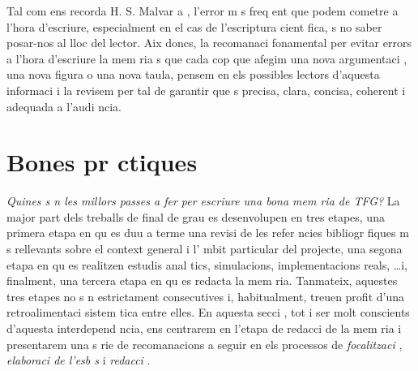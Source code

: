 Tal com ens recorda H. S. Malvar a \cite{Malvar08}, l'error m s freq ent que podem cometre a l'hora d'escriure, especialment en el cas de l'escriptura cient fica,  s no saber posar-nos al lloc del lector. Aix  doncs, la recomanaci  fonamental per evitar errors a l'hora d'escriure la mem ria  s que cada cop que afegim una nova argumentaci , una nova figura o una nova taula, pensem en els possibles lectors d'aquesta informaci  i la revisem per tal de garantir que  s precisa, clara, concisa, coherent i adequada a l'audi ncia.

\section{Bones pr ctiques}

\emph{Quines s n les millors passes a fer per escriure una bona mem ria de TFG?} La major part dels treballs de final de grau es desenvolupen en tres etapes, una primera etapa en qu  es duu a terme una revisi  de les refer ncies bibliogr fiques m s rellevants sobre el context general i l' mbit particular del projecte, una segona etapa en qu  es realitzen estudis anal tics, simulacions, implementacions reals, \ldots i, finalment, una tercera etapa en qu  es redacta la mem ria. Tanmateix, aquestes tres etapes no s n estrictament consecutives i, habitualment, treuen profit d'una retroalimentaci  sistem tica entre elles. En aquesta secci , tot i ser molt conscients d'aquesta interdepend ncia, ens centrarem en l'etapa de redacci  de la mem ria i presentarem una s rie de recomanacions a seguir en els processos de \emph{focalitzaci }, \emph{elaboraci  de l'esb s} i \emph{redacci }.

